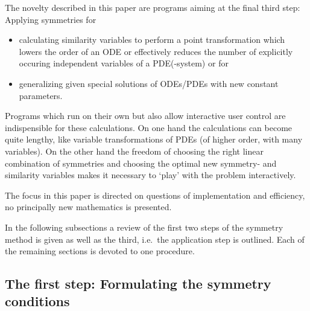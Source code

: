 \documentclass[12pt]{article}
\begin{document}
The novelty described in this paper are programs aiming at
the final third step: Applying symmetries for
\begin{itemize}
\item calculating similarity variables to perform a point transformation
which lowers the order of an ODE or effectively reduces the number of
explicitly occuring independent variables of a PDE(-system) or for
\item generalizing given special solutions of ODEs/PDEs with new constant
parameters.
\end{itemize}
Programs which run on their own but also allow interactive user control
are indispensible for these calculations. On one hand the calculations can
become quite lengthy, like variable transformations of PDEs (of higher order,
with many variables). On the other hand the freedom of choosing the right
linear combination of symmetries and choosing the optimal new symmetry- and
similarity variables makes it necessary to `play' with the problem
interactively.

The focus in this paper is directed on questions of implementation and
efficiency, no principally new mathematics is presented.

In the following subsections a review of the first two steps of the symmetry
method is given as well as the third, i.e.\ the application step is outlined.
Each of the remaining sections is devoted to one procedure.
\subsection{The first step: Formulating the symmetry conditions}
\end{document}
